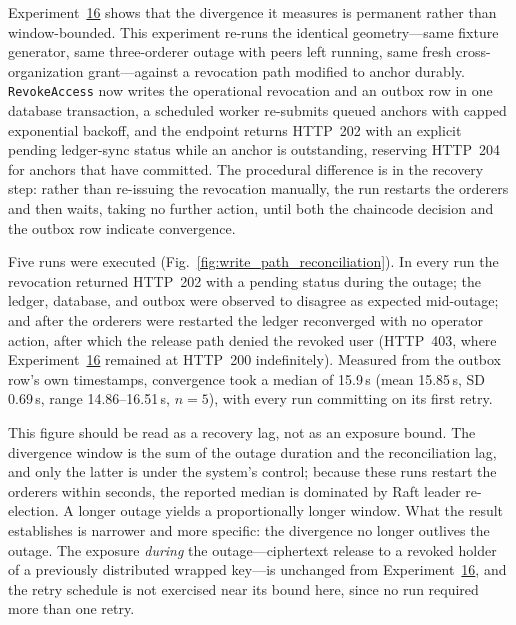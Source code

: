 \documentclass[preprint,12pt]{elsarticle}
\begin{document}
Experiment~\hyperref[sec:exp_orderer_outage]{16} shows that the divergence it
measures is permanent rather than window-bounded. This experiment re-runs the
identical geometry---same fixture generator, same three-orderer outage with
peers left running, same fresh cross-organization grant---against a revocation
path modified to anchor durably. \texttt{RevokeAccess} now writes the
operational revocation and an outbox row in one database transaction, a
scheduled worker re-submits queued anchors with capped exponential backoff, and
the endpoint returns HTTP~202 with an explicit pending ledger-sync status while
an anchor is outstanding, reserving HTTP~204 for anchors that have committed.
The procedural difference is in the recovery step: rather than re-issuing the
revocation manually, the run restarts the orderers and then waits, taking no
further action, until both the chaincode decision and the outbox row indicate
convergence.

Five runs were executed (Fig.~\ref{fig:write_path_reconciliation}). In every run the revocation returned HTTP~202 with a
pending status during the outage; the ledger, database, and outbox were
observed to disagree as expected mid-outage; and after the orderers were
restarted the ledger reconverged with no operator action, after which the
release path denied the revoked user (HTTP~403, where
Experiment~\hyperref[sec:exp_orderer_outage]{16} remained at HTTP~200
indefinitely). Measured from the outbox row's own timestamps, convergence took
a median of 15.9\,s (mean 15.85\,s, SD 0.69\,s, range 14.86--16.51\,s,
$n=5$), with every run committing on its first retry.

This figure should be read as a recovery lag, not as an exposure bound. The
divergence window is the sum of the outage duration and the reconciliation lag,
and only the latter is under the system's control; because these runs restart
the orderers within seconds, the reported median is dominated by Raft leader
re-election. A longer outage yields a proportionally longer window. What the
result establishes is narrower and more specific: the divergence no longer
outlives the outage. The exposure \emph{during} the outage---ciphertext release
to a revoked holder of a previously distributed wrapped key---is unchanged from
Experiment~\hyperref[sec:exp_orderer_outage]{16}, and the retry schedule is not
exercised near its bound here, since no run required more than one retry.
\end{document}
